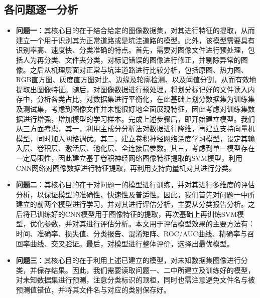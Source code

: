 \documentclass{MathorCupmodeling}
\begin{document}
	\subsection{各问题逐一分析}
	\begin{itemize}
		\item \textbf{问题一}：其核心目的在于{\heiti 结合给定的图像数据集，对其进行特征的提取，从而建立一个用于识别其为正常道路或是坑洼道路的模型}。此外，该模型需要具有{\heiti 识别率高、速度快、分类准确}的特点。首先，需要对图像文件进行预处理，包括人为再分类、文件夹分类，对标记错误的图像进行修正，并剔除异常的图像。之后从机理层面对正常与坑洼道路进行比较分析，包括原图、热力图、RGB直方图、灰度直方图对比、边缘及轮廓检测、以及阈值分割，从而有效地提取出图像特征。随后，对图像数据进行预处理，将划分标记好的文件读入内存中，分析各类占比，对数据集进行平衡化，在此基础上划分数据集为训练集及测试集，考虑到图像文件并未能很好地全面展现特征，因此考虑对训练集数据进行增强，增加模型的学习样本。完成上述步骤后，即开始建立模型。我们从三方面考虑，其一，利用主成分分析法对数据进行降维，再建立支持向量机模型，同时加入网格调优。其二，建立卷积神经网络深度学习模型，设定其输入层、卷积层、激活层、池化层、全连接层参数。其三，考虑到单一模型存在一定局限性，因此建立基于卷积神经网络图像特征提取的SVM模型，利用CNN网络对图像数据进行特征提取，再利用支持向量机对其进行分类。
		\item \textbf{问题二}：其核心目的在于{\heiti 对问题一的模型进行训练，并对其进行多维度的评估分析，以保证模型的准确性、快速性及普适性}。因此，我们首先对问题一中所建立的前两个模型进行学习，并对其进行评估分析，主要从分类报告分析。之后将已训练好的CNN模型用于图像特征的提取，再次基础上再训练SVM模型，优化参数，并对其进行评估分析。本文用于评估模型效果的主要方法有：时间、准确率、损失值、分类报告、混淆矩阵、ROC/AUC曲线、精确率与召回率曲线、交叉验证。最后，对模型进行整体评价，选择出最优模型。
		\item \textbf{问题三}：其核心目的在于{\heiti 利用上述已建立的模型，对未知数据集图像进行分类，并保存结果}。因此，我们需要读取问题一、二中所建立及训练好的模型，对未知数据集进行预测，注意分类标识的顶柜，同时也需注意避免文件名与被预测值错位，并将其文件名与对应的类别保存好。
	\end{itemize}
\end{document}
